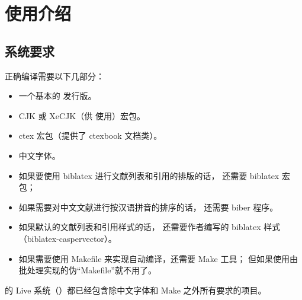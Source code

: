 %
%
%
%
%

\chapter{使用介绍}
	\section{系统要求}\label{sec:req}

	正确编译需要以下几部分：
	\begin{itemize}
		\item 一个基本的  发行版。
		\item CJK 或 XeCJK（供  使用）宏包。
		\item ctex 宏包\supercite{ctex,ctex-faq}（提供了 ctexbook 文档类）。
		\item 中文字体。
		\item 如果要使用 biblatex 进行文献列表和引用的排版的话，
			还需要 biblatex 宏包\supercite{biblatex}；
		\item 如果需要对中文文献进行按汉语拼音的排序的话，
			还需要 biber 程序\supercite{biber}。
		\item 如果默认的文献列表和引用样式的话，
			还需要作者编写的 biblatex 样式
			（biblatex-caspervector）\supercite{biblatex-caspervector}。
		\item 如果需要使用 Makefile 来实现自动编译，还需要 Make 工具；
			但如果使用由批处理实现的伪“Makefile”就不用了。
	\end{itemize}

	的  Live 系统（）都已经包含除中文字体和 Make 之外所有要求的项目。%

